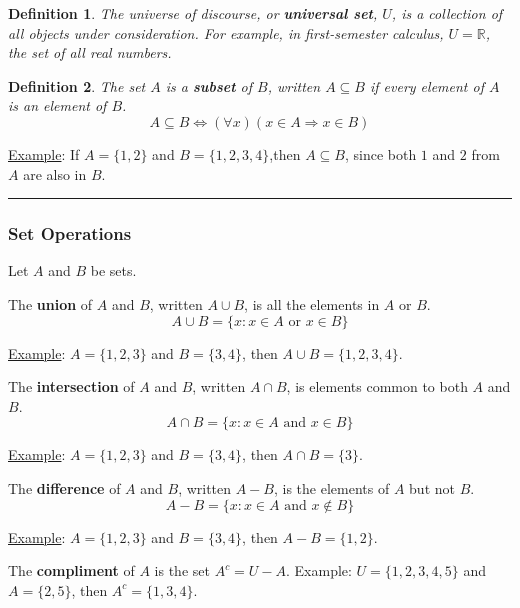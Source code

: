 \documentclass{article}
\newtheorem{definition}{Definition}
\begin{document}
 
 
  \begin{definition}
The universe of discourse, or \textbf{universal set}, $U$, is  a collection of all objects under consideration.  For example, in first-semester calculus, $U = \mathbb{R}$, the set of all real numbers.  
 \end{definition}
 
 
  \begin{definition}
The set $A$ is a \textbf{subset} of $B$, written $A \subseteq B$ if every element of $A$ is an element of $B$.   
\[
A \subseteq B  \iff  (\forall x) (x \in A \Rightarrow x \in B)
\] 
 \end{definition}
 
\noindent \underline{Example}: If $A = \{1,2\}$ and $B = \{1,2,3, 4\}$,then $A \subseteq B$, since both $1$ and $2$ from $A$ are also in $B$. 
 
 
 
 
 
 
 
 
 \hspace{-0.5cm}\rule[-0.101in]{\textwidth}{0.0025in}
 
 \subsubsection*{Set Operations}
 
 Let $A$ and $B$ be sets.  
 \begin{outline}

        



        \1 The \textbf{union} of $A$ and $B$, written $A \cup B$, is all the elements in $A$ or $B$.
\[ 
     A \cup B = \{ x :  x \in A  \textrm{ or } x \in B \}   
\]

\underline{Example}: $A = \{1,2,3  \}$ and $B = \{3,4\}$, then $A \cup B = \{1, 2, 3, 4\}$. 



 

        \1  The \textbf{intersection} of $A$ and $B$, written $A \cap B$, is elements common to both $A$ and $B$.
\[ 
     A \cap B = \{ x :  x \in A  \textrm{ and } x \in B \}   
\]

\underline{Example}: $A = \{1,2,3  \}$ and $B = \{3,4\}$, then $A \cap B
= \{3 \}$.






        \1  The \textbf{difference} of $A$ and $B$, written $A - B$, is the elements of $A$ but not $B$.
\[ 
     A - B = \{ x :  x \in A  \textrm{ and } x \not\in B \}   
\]

\underline{Example}: $A = \{1,2,3  \}$ and $B = \{3,4\}$, then $A - B
= \{ 1,2 \}$.





        \1 The \textbf{compliment} of $A$ is the set $A^c = U - A$. Example: $U = \{1, 2, 3, 4, 5\}$ and $A = \{2, 5\}$, then $A^c = \{1, 3, 4\}$.  
        
 \end{outline}
\end{document}
